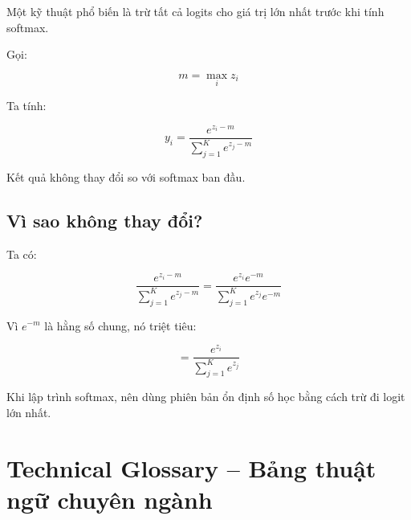 Một kỹ thuật phổ biến là trừ tất cả logits cho giá trị lớn nhất trước khi tính softmax.

Gọi:

\[
    m = \max_i z_i
\]

Ta tính:

\[
    y_i =
    \frac{e^{z_i-m}}
    {\sum_{j=1}^{K} e^{z_j-m}}
\]

Kết quả không thay đổi so với softmax ban đầu.

\subsection{Vì sao không thay đổi?}

Ta có:

\[
    \frac{e^{z_i-m}}
    {\sum_{j=1}^{K}e^{z_j-m}}
    =
    \frac{e^{z_i}e^{-m}}
    {\sum_{j=1}^{K}e^{z_j}e^{-m}}
\]

Vì $e^{-m}$ là hằng số chung, nó triệt tiêu:

\[
    =
    \frac{e^{z_i}}
    {\sum_{j=1}^{K}e^{z_j}}
\]

\begin{ghinho}
Khi lập trình softmax, nên dùng phiên bản ổn định số học bằng cách trừ đi logit lớn nhất.
\end{ghinho}

\section{Technical Glossary -- Bảng thuật ngữ chuyên ngành}

